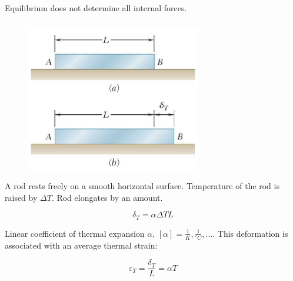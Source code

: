 \noindent Equilibrium does not determine all internal forces.

\subsubsection{}



\noindent {}

\begin{figure}[!h]
\centering
\includegraphics[angle=0, width=3in]{Axial Loading-Figures/Temperature_NoLoad.png}
\vspace{-2mm}
\caption{\small {}}
\vspace{-3mm}
\label{Fig:TempNoLoad}
\end{figure}

\noindent A rod rests freely on a smooth horizontal surface. Temperature of the rod is raised by $\Delta T$. Rod elongates by an amount.

\[\delta_{T} = \alpha \Delta T L\]

\noindent Linear coefficient of thermal expansion $\alpha$,  $[\alpha] = \frac{1}{K},\frac{1}{°C},...$. This deformation is associated with an average thermal strain:

\[\varepsilon_{T} = \frac{\delta_T}{L} = \alpha T\]

